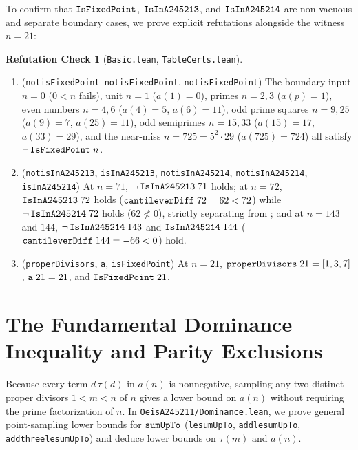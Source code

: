 \documentclass[11pt,reqno]{amsart}
\theoremstyle{plain}
\theoremstyle{definition}
\newtheorem{refutation}[theorem]{Refutation Check}
\theoremstyle{remark}
\newcommand{\leanid}[1]{\texttt{\upshape\def\_{\char95\relax}#1}}
\begin{document}
To confirm that $\leanid{IsFixedPoint}$, $\leanid{IsInA245213}$, and $\leanid{IsInA245214}$ are non-vacuous and separate boundary cases, we prove explicit refutations alongside the witness $n = 21$:

\begin{refutation}[\leanid{Basic.lean}, \leanid{TableCerts.lean}]
\label{ref:checks}
\leavevmode
\begin{enumerate}
  \item (\leanid{not\_\allowbreak isFixedPoint\_}--\leanid{not\_\allowbreak isFixedPoint\_}, \leanid{not\_\allowbreak isFixedPoint\_}) The boundary input $n = 0$ ($0 < n$ fails), unit $n = 1$ ($a(1) = 0$), primes $n = 2, 3$ ($a(p) = 1$), even numbers $n = 4, 6$ ($a(4) = 5$, $a(6) = 11$), odd prime squares $n = 9, 25$ ($a(9) = 7$, $a(25) = 11$), odd semiprimes $n = 15, 33$ ($a(15) = 17$, $a(33) = 29$), and the near-miss $n = 725 = 5^2 \cdot 29$ ($a(725) = 724$) all satisfy $\neg\,\leanid{IsFixedPoint}\;n$.
  \item (\leanid{not\_\allowbreak isInA245213\_}, \leanid{isInA245213\_}, \leanid{not\_\allowbreak isInA245214\_\allowbreak 72}, \leanid{not\_\allowbreak isInA245214\_}, \leanid{isInA245214\_}) At $n = 71$, $\neg\,\leanid{IsInA245213}\;71$ holds; at $n = 72$, $\leanid{IsInA245213}\;72$ holds ($\leanid{cantileverDiff}\;72 = 62 < 72$) while $\neg\,\leanid{IsInA245214}\;72$ holds ($62 \not< 0$), strictly separating  from ; and at $n = 143$ and $144$, $\neg\,\leanid{IsInA245214}\;143$ and $\leanid{IsInA245214}\;144$ ($\leanid{cantileverDiff}\;144 = -66 < 0$) hold.
  \item (\leanid{properDivisors\_}, \leanid{a\_}, \leanid{isFixedPoint\_\allowbreak 21}) At $n = 21$, $\leanid{properDivisors}\;21 = [1, 3, 7]$, $\leanid{a}\;21 = 21$, and $\leanid{IsFixedPoint}\;21$.
\end{enumerate}
\end{refutation}

\section{The Fundamental Dominance Inequality and Parity Exclusions}

Because every term $d\,\tau(d)$ in $a(n)$ is nonnegative, sampling any two distinct proper divisors $1 < m < n$ of $n$ gives a lower bound on $a(n)$ without requiring the prime factorization of $n$. In \leanid{OeisA245211/Dominance.lean}, we prove general point-sampling lower bounds for $\leanid{sumUpTo}$ (\leanid{le\_\allowbreak sumUpTo}, \leanid{add\_\allowbreak le\_\allowbreak sumUpTo}, \leanid{add\_\allowbreak three\_\allowbreak le\_\allowbreak sumUpTo}) and deduce lower bounds on $\tau(m)$ and $a(n)$.
\end{document}
